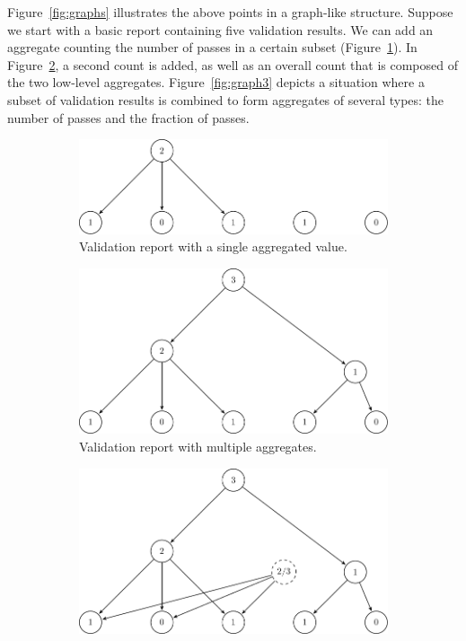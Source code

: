 Figure~\ref{fig:graphs} illustrates the above points in a graph-like structure.
Suppose we start with a basic report containing five validation results. We can
add an aggregate counting the number of passes in a certain subset
(Figure~\ref{fig:graph1}).  In Figure~\ref{fig:graph2}, a second count is
added, as well as an overall count that is composed of the two low-level
aggregates. Figure~\ref{fig:graph3} depicts a situation where a subset of
validation results is combined to form aggregates of several types: the number
of passes and the fraction of passes.
%
\begin{figure}[!t]
  \centering
  \begin{subfigure}[b]{0.7\textwidth}
    \includegraphics[width=\textwidth]{fig/graph1.pdf}
    \caption{Validation report with a single aggregated value.}
    \label{fig:graph1}
  \end{subfigure}
  \begin{subfigure}[b]{0.7\textwidth}
    \includegraphics[width=\textwidth]{fig/graph2.pdf}
    \caption{Validation report with multiple aggregates.}
    \label{fig:graph2}
  \end{subfigure}
  \begin{subfigure}[b]{0.7\textwidth}
    \includegraphics[width=\textwidth]{fig/graph3.pdf}

\end{subfigure}
\end{figure}
